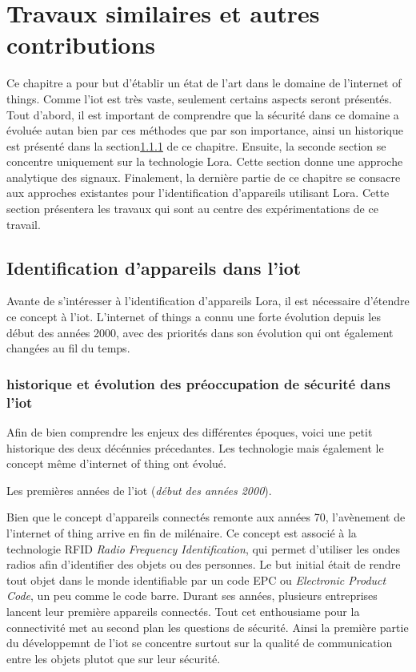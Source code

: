 \chapter{Travaux similaires et autres contributions}

Ce chapitre a pour but d'établir un état de l'art dans le domaine de l'internet of things. Comme l'iot est très vaste, seulement certains aspects seront présentés. Tout d'abord, il est important de comprendre que la sécurité dans ce domaine a évoluée autan bien par ces méthodes que par son importance, ainsi un historique est présenté dans la section\ref{histoire} de ce chapitre. Ensuite, la seconde section se concentre uniquement sur la technologie Lora. Cette section donne une approche analytique des signaux. Finalement, la dernière partie de ce chapitre se consacre aux approches existantes pour l'identification d'appareils utilisant Lora. Cette section présentera les travaux qui sont au centre des expérimentations de ce travail.


\section{Identification d'appareils dans l'iot}

Avante de s'intéresser à l'identification d'appareils Lora, il est nécessaire d'étendre ce concept à l'iot. L'internet of things a connu une forte évolution depuis les début des années 2000, avec des priorités dans son évolution qui ont également changées au fil du temps.

\subsection{historique et évolution des préoccupation de sécurité dans l'iot}\label{histoire}

Afin de bien comprendre les enjeux des différentes époques, voici une petit historique des deux décénnies précedantes. Les technologie mais également le concept même d'internet of thing ont évolué.

\vspace{0.1cm}

Les premières années de l'iot (\textit{début des années 2000}).

Bien que le concept d'appareils connectés remonte aux années 70, l'avènement de l'internet of thing arrive en fin de milénaire. Ce concept est associé à la technologie RFID \textit{Radio Frequency Identification}\cite{RFID}, qui permet d'utiliser les ondes radios afin d'identifier des objets ou des personnes. Le but initial était de rendre tout objet dans le monde identifiable par un code EPC ou \textit{Electronic Product Code}\cite{EPC}, un peu comme le code barre. Durant ses années, plusieurs entreprises lancent leur première appareils connectés. Tout cet enthousiame pour la connectivité met au second plan les questions de sécurité. Ainsi la première partie du développemnt de l'iot se concentre surtout sur la qualité de communication entre les objets plutot que sur leur sécurité.


